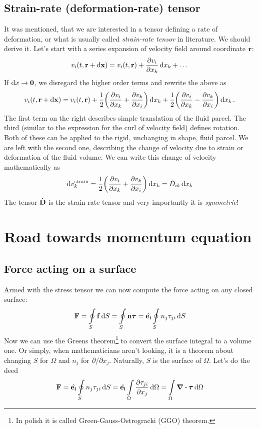 \documentclass[justified, nobib]{tufte-handout}
\begin{document}
\subsection{Strain-rate (deformation-rate) tensor}
It was mentioned, that we are interested in a tensor defining a rate of
deformation, or what is usually called \emph{strain-rate tensor} in
literature. We should derive it. Let's start with a series expansion of
velocity field around coordinate \(\vb{r}\):
\[
	v_i(t, \vb{r} + \dd{\vb{x}}) = v_i(t, \vb{r}) + \pdv{v_i}{x_k}\dd{x_k}
	+ \dots
\]
If \(\dd{x}\rightarrow\vb{0}\), we disregard the higher order terms and
rewrite the above as
\[
	v_i(t, \vb{r} + \dd{\vb{x}}) = v_i(t, \vb{r})
	+ \frac{1}{2}\qty(\pdv{v_i}{x_k} + \pdv{v_k}{x_i})\dd{x_k}
	+ \frac{1}{2}\qty(\pdv{v_i}{x_k} - \pdv{v_k}{x_i})\dd{x_k}.
\]
The first term on the right describes simple translation of the fluid parcel.
The third (similar to the expression for the curl of velocity field) defines
rotation. Both of these can be applied to the rigid, unchanging in shape,
fluid parcel. We are left with the second one, describing the change of
velocity due to  strain or deformation of the fluid volume.
We can write this change of velocity mathematically as
\begin{equation}\label{eq::strain_rate_tensor}
	\dd{v^\mathrm{strain}_k}
	= \frac{1}{2}\qty(\pdv{v_i}{x_k} + \pdv{v_k}{x_i})\dd{x_k}
	= \dot{D}_{ik}\dd{x_k}
\end{equation}
The tensor \(\dot{\vb{D}}\) is the strain-rate tensor and very importantly
it is \emph{symmetric}!



\section{Road towards momentum equation}

\subsection{Force acting on a surface}
Armed with the stress tensor we can now compute the force acting on any
closed surface:
\[
	\vb{F} = \oint\limits_S \vb{f} \dd{S}
	= \oint\limits_S \vb{n}\bm{\tau}
	= \hat{\vb{e_i}}\oint\limits_S n_j \tau_{ji}\dd{S}
\]
Now we can use the Greens theorem\footnote{In polish it is called
	Green-Gauss-Ostrogracki (GGO) theorem.} to convert the surface integral
to a volume one. Or simply, when mathematicians aren't looking, it is
a theorem about changing \(S\) for \(\Omega\) and \(n_j\) for
\(\partial/\partial x_j\). Naturally, \(S\) is the surface of \(\Omega\).
Let's do the deed
\[
	\vb{F}
	= \hat{\vb{e_i}}\oint\limits_S n_j \tau_{ji}\dd{S}
	= \hat{\vb{e_i}}\int\limits_\Omega \pdv{\tau_{ji}}{x_j}\dd{\Omega}
	= \int\limits_\Omega \div\bm{\tau} \dd{\Omega}
\]
\end{document}

